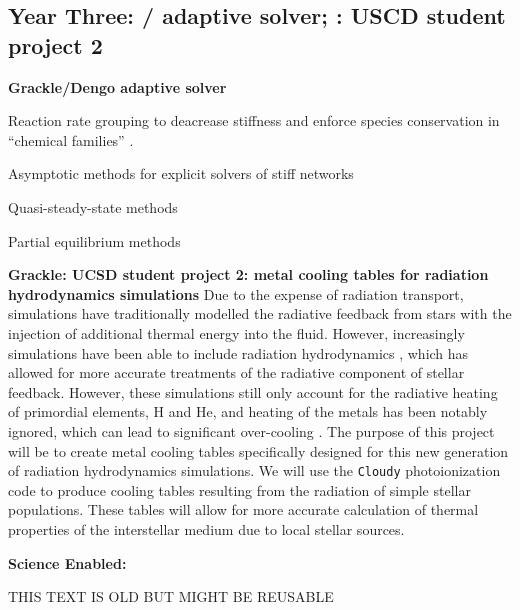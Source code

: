 \subsection{Year Three: \grackle{}/\dengo{} adaptive solver;
  \grackle{}: USCD student project 2}

\noindent \textbf{Grackle/Dengo adaptive solver}

Reaction rate grouping to deacrease stiffness and enforce species
conservation in ``chemical families''
\citep{doi:10.1002/kin.550100907, SANDU19973151}.

Asymptotic methods for explicit solvers of stiff networks
\citep{1749-4699-6-1-015001}

Quasi-steady-state methods \citep{1749-4699-6-1-015002}

Partial equilibrium methods \citep{1749-4699-6-1-015003}

\noindent \textbf{Grackle: UCSD student project 2: metal cooling
  tables for radiation hydrodynamics simulations}
Due to the expense of radiation transport, simulations have
traditionally modelled the radiative feedback from stars with the
injection of additional thermal energy into the fluid.  However,
increasingly simulations have been able to include radiation
hydrodynamics \citep{2012MNRAS.427..311W, Xu_2013, Wise_2014,
2015ApJ...807L..12O}, which has allowed for more accurate treatments of the
radiative component of stellar feedback.  However, these simulations
still only account for the radiative heating of primordial elements, H
and He, and heating of the metals has been notably ignored, which can
lead to significant over-cooling \citep{2011MNRAS.413..190T,
  2012MNRAS.427..311W}.  The purpose of this project will be to create
metal cooling tables specifically designed for this new generation of
radiation hydrodynamics simulations.  We will use the \texttt{Cloudy}
photoionization code to produce cooling tables resulting from the
radiation of simple stellar populations.  These tables will allow for
more accurate calculation of thermal properties of the interstellar
medium due to local stellar sources.

\textbf{Science Enabled:}

THIS TEXT IS OLD BUT MIGHT BE REUSABLE

